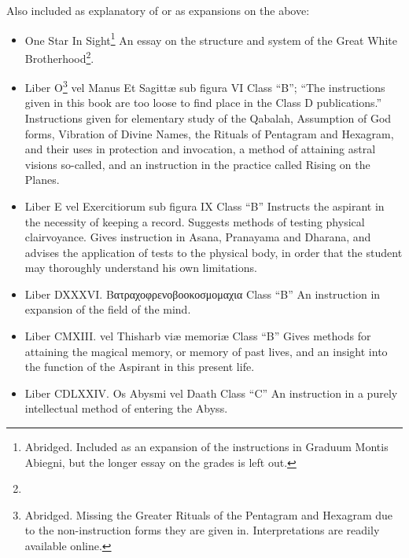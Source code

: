 \begin{samepage}
Also included as explanatory of or as expansions on the above: \begin{itemize}
\item One Star In Sight\footnote{Abridged. Included as an expansion of the instructions in Graduum Montis Abiegni, but the longer essay on the grades is left out.} \textemdash{} An essay on the structure and system of the Great White Brotherhood\footnote{\Argentium{}}.
\item Liber O\footnote{Abridged. Missing the Greater Rituals of the Pentagram and Hexagram due to the non-instruction forms they are given in. Interpretations are readily available online.} vel Manus Et Sagitt\ae{} sub figura VI \textemdash{} Class \enquote{B}; \enquote{The instructions given in this book are too loose to find place in the Class D publications.} \textemdash{} Instructions given for elementary study of the Qabalah, Assumption of God forms, Vibration of Divine Names, the Rituals of Pentagram and Hexagram, and their uses in protection and invocation, a method of attaining astral visions so-called, and an instruction in the practice called Rising on the Planes.
\item Liber E vel Exercitiorum sub figura IX \textemdash{} Class \enquote{B} \textemdash{} Instructs the aspirant in the necessity of keeping a record. Suggests methods of testing physical clairvoyance. Gives instruction in Asana, Pranayama and Dharana, and advises the application of tests to the physical body, in order that the student may thoroughly understand his own limitations.
\item Liber DXXXVI. \textgreek{Βατραχοφρενοβοοκοσμομαχια} \textemdash{} Class \enquote{B} \textemdash{} An instruction in expansion of the field of the mind.
\item Liber CMXIII.  vel Thisharb vi\ae{}{} memori\ae{}{} \textemdash{} Class \enquote{B} \textemdash{} Gives methods for attaining the magical memory, or memory of past lives, and an insight into the function of the Aspirant in this present life.
\item Liber CDLXXIV. Os Abysmi vel Daath \textemdash{} Class \enquote{C} \textemdash{} An instruction in a purely intellectual method of entering the Abyss.
\end{itemize}
\end{samepage}
